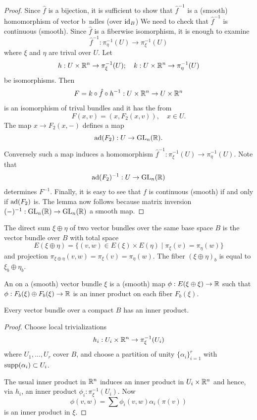 \begin{proof}
  Since $\hat f$ is a bijection, it is sufficient to show that $\hat f^{-1}$ is a (smooth)
  homomorphism of vector b~ndles (over $\operatorname{id}_B$) We need to check that $\hat f^{-1}$ is
  continuous (smooth). Since $\hat f$ is a fiberwise isomorphism, it is enough to examine
  \[
    \hat f^{-1}:\pi^{-1}_\eta(U)\to \pi^{-1}_\xi(U)
  \]
  where $\xi$ and $\eta$ are trival over $U$. Let 
  \[
    h:U\times{\ensuremath{\mathbb{R}}}^n\to\pi^{-1}_\xi(U);\quad k:U\times{\ensuremath{\mathbb{R}}}^n\to\pi^{-1}_\eta(U)
  \]
  be isomorphisms. Then 
  \[
    F = k\circ \hat f\circ h^{-1}:U\times{\ensuremath{\mathbb{R}}}^n\to U\times{\ensuremath{\mathbb{R}}}^n
  \]
  is an isomorphism of trival bundles and it has the from 
  \[
    F(x, v) = (x, F_2(x, v)), \quad x\in U.
  \]
  The map $x\to F_2(x, -)$ defines a map 
  \[
    \mathrm{ad}(F_2):U\to\mathrm{GL}_n({\mathbb{R}}).
  \]
  Conversely such a map induces a homomorphism $\hat f^{-1}:\pi^{-1}_\xi(U)\to\pi^{-1}_\eta(U)$. Note that 
  \[
    \mathrm{ad}(F_2)^{-1}:U\to\mathrm{GL}_n({\mathbb{R}})
  \]
  determines $F^{-1}$. Finally, it is easy to see that $f$ is continuous (smooth) if and only
  if $\mathrm{ad}(F_2)$ is. The lemma now follows because matrix inversion $(-)^{-1}: \mathrm{GL}_n({\mathbb{R}})\to\mathrm{GL}_n({\mathbb{R}})$
  a smooth map.
\end{proof}

\begin{definition}\label{definition:15-11}
  The direct sum $\xi\oplus\eta$ of two vector bundles over the same base space $B$ is the vector 
  bundle over $B$ with total space
  \[
    E(\xi\oplus\eta) = \{(v, w)\in E(\xi)\times E(\eta)\mid \pi_\xi(v)=\pi_\eta(w)\}
  \]
  and projection $\pi_{\xi\oplus\eta}(v, w)=\pi_\xi(v)=\pi_\eta(w)$. The fiber $(\xi\oplus\eta)_b$
  is equal to $\xi_b\oplus\eta_b$.
\end{definition}

\begin{definition}\label{definition:15-12}
  An  on a (smooth) vector bundle $\xi$ is a (smooth)
  map $\phi:E(\xi\oplus\xi)\to{\ensuremath{\mathbb{R}}}$ such that $\phi:F_b(\xi)\oplus F_b(\xi)\to{\ensuremath{\mathbb{R}}}$ is an inner product on
  each fiber $F_b(\xi)$.
\end{definition}

\begin{proposition}\label{proposition:15-13}
  Every vector bundle over a compact $B$ has an inner product.
\end{proposition}

\begin{proof}
  Choose local trivializations
  \[
    h_i:U_i\times{\ensuremath{\mathbb{R}}}^n\to\pi^{-1}_\xi(U_i)
  \]
  where $U_1,\ldots, U_r$ cover $B$, and choose a partition of unity $\{\alpha_i\}_{i=1}^r$
  with $\operatorname{supp}(\alpha_i)\subset U_i$.

  The usual inner product in ${\mathbb{R}}^n$ induces an inner product in $U_i\times{\ensuremath{\mathbb{R}}}^n$ and hence,
  via $h_i$, an inner product $\phi_i:\pi^{-1}_\xi(U_i)$. Now
  \[
    \phi(v, w) = \sum \phi_i(v, w)\alpha_i(\pi(v))
  \]
  is an inner product in $\xi$.
\end{proof}

